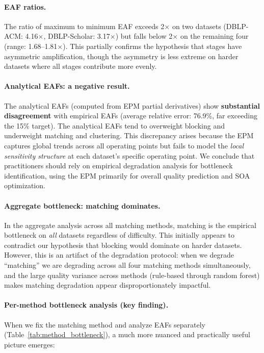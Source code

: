 \documentclass{article}
\begin{document}
\paragraph{EAF ratios.}
The ratio of maximum to minimum EAF exceeds 2$\times$ on two datasets (DBLP-ACM: 4.16$\times$, DBLP-Scholar: 3.17$\times$) but falls below 2$\times$ on the remaining four (range: 1.68--1.81$\times$). This partially confirms the hypothesis that stages have asymmetric amplification, though the asymmetry is less extreme on harder datasets where all stages contribute more evenly.

\paragraph{Analytical EAFs: a negative result.}
The analytical EAFs (computed from EPM partial derivatives) show \textbf{substantial disagreement} with empirical EAFs (average relative error: 76.9\%, far exceeding the 15\% target). The analytical EAFs tend to overweight blocking and underweight matching and clustering. This discrepancy arises because the EPM captures global trends across all operating points but fails to model the \emph{local sensitivity structure} at each dataset's specific operating point. We conclude that practitioners should rely on empirical degradation analysis for bottleneck identification, using the EPM primarily for overall quality prediction and SOA optimization.

\paragraph{Aggregate bottleneck: matching dominates.}
In the aggregate analysis across all matching methods, matching is the empirical bottleneck on \emph{all} datasets regardless of difficulty. This initially appears to contradict our hypothesis that blocking would dominate on harder datasets. However, this is an artifact of the degradation protocol: when we degrade ``matching'' we are degrading across all four matching methods simultaneously, and the large quality variance across methods (rule-based through random forest) makes matching degradation appear disproportionately impactful.

\paragraph{Per-method bottleneck analysis (key finding).}
When we fix the matching method and analyze EAFs separately (Table~\ref{tab:method_bottleneck}), a much more nuanced and practically useful picture emerges:
\end{document}
